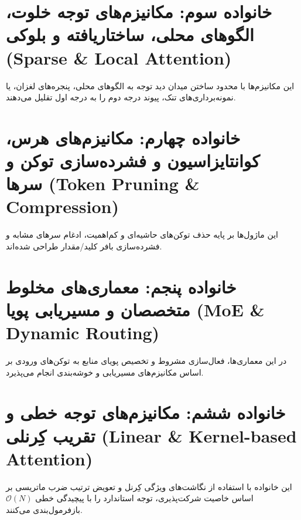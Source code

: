 \section{خانواده سوم: مکانیزم‌های توجه خلوت، الگوهای محلی، ساختاریافته و بلوکی (Sparse \& Local Attention)}
\label{sec:family_sparse}
این مکانیزم‌ها با محدود ساختن میدان دید توجه به الگوهای محلی، پنجره‌های لغزان، یا نمونه‌برداری‌های تنک، پیوند درجه دوم را به درجه اول تقلیل می‌دهند.






\section{خانواده چهارم: مکانیزم‌های هرس، کوانتایزاسیون و فشرده‌سازی توکن و سرها (Token Pruning \& Compression)}
\label{sec:family_pruning}
این ماژول‌ها بر پایه حذف توکن‌های حاشیه‌ای و کم‌اهمیت، ادغام سرهای مشابه و فشرده‌سازی بافر کلید/مقدار طراحی شده‌اند.






\section{خانواده پنجم: معماری‌های مخلوط متخصصان و مسیریابی پویا (MoE \& Dynamic Routing)}
\label{sec:family_moe}
در این معماری‌ها، فعال‌سازی مشروط و تخصیص پویای منابع به توکن‌های ورودی بر اساس مکانیزم‌های مسیریابی و خوشه‌بندی انجام می‌پذیرد.









\section{خانواده ششم: مکانیزم‌های توجه خطی و تقریب کِرنلی (Linear \& Kernel-based Attention)}
\label{sec:family_linear}
این خانواده با استفاده از نگاشت‌های ویژگی کِرنل و تعویض ترتیب ضرب ماتریسی بر اساس خاصیت شرکت‌پذیری، توجه استاندارد را با پیچیدگی خطی $\mathcal{O}(N)$ بازفرمول‌بندی می‌کنند.

